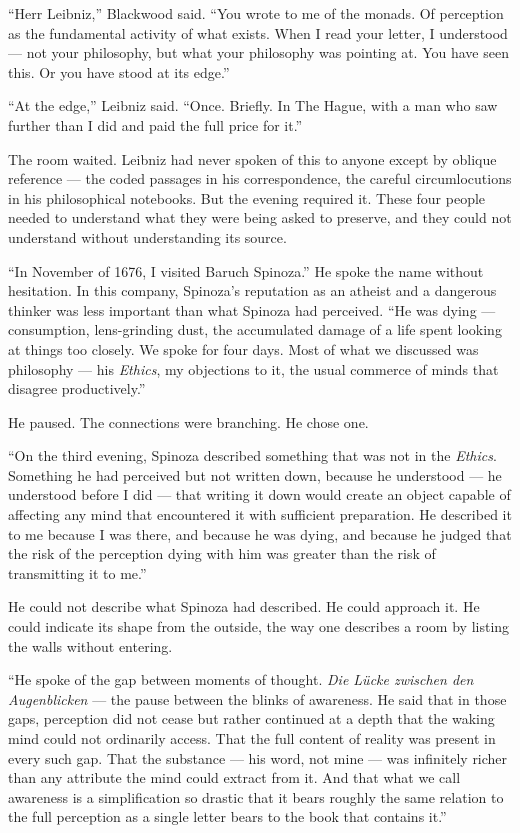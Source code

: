 ``Herr Leibniz,'' Blackwood said. ``You wrote to me of the monads. Of perception as the fundamental activity of what exists. When I read your letter, I understood --- not your philosophy, but what your philosophy was pointing at. You have seen this. Or you have stood at its edge.''

``At the edge,'' Leibniz said. ``Once. Briefly. In The Hague, with a man who saw further than I did and paid the full price for it.''

\scenebreak

The room waited. Leibniz had never spoken of this to anyone except by oblique reference --- the coded passages in his correspondence, the careful circumlocutions in his philosophical notebooks. But the evening required it. These four people needed to understand what they were being asked to preserve, and they could not understand without understanding its source.

``In November of 1676, I visited Baruch Spinoza.'' He spoke the name without hesitation. In this company, Spinoza's reputation as an atheist and a dangerous thinker was less important than what Spinoza had perceived. ``He was dying --- consumption, lens-grinding dust, the accumulated damage of a life spent looking at things too closely. We spoke for four days. Most of what we discussed was philosophy --- his \emph{Ethics}, my objections to it, the usual commerce of minds that disagree productively.''

He paused. The connections were branching. He chose one.

``On the third evening, Spinoza described something that was not in the \emph{Ethics}. Something he had perceived but not written down, because he understood --- he understood before I did --- that writing it down would create an object capable of affecting any mind that encountered it with sufficient preparation. He described it to me because I was there, and because he was dying, and because he judged that the risk of the perception dying with him was greater than the risk of transmitting it to me.''

He could not describe what Spinoza had described. He could approach it. He could indicate its shape from the outside, the way one describes a room by listing the walls without entering.

``He spoke of the gap between moments of thought. \emph{Die L\"ucke zwischen den Augenblicken} --- the pause between the blinks of awareness. He said that in those gaps, perception did not cease but rather continued at a depth that the waking mind could not ordinarily access. That the full content of reality was present in every such gap. That the substance --- his word, not mine --- was infinitely richer than any attribute the mind could extract from it. And that what we call awareness is a simplification so drastic that it bears roughly the same relation to the full perception as a single letter bears to the book that contains it.''

